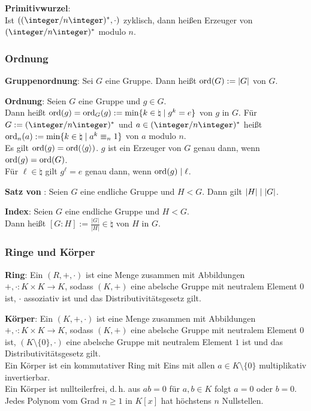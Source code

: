 \textbf{Primitivwurzel}:\\
Ist $((\ZnZ)^\ast, \cdot)$ zyklisch, dann heißen Erzeuger von $(\ZnZ)^\ast$
 modulo $n$.

\pagebreak

\subsubsection{%
    Ordnung%
}

\textbf{Gruppenordnung}:
Sei $G$ eine Gruppe.
Dann heißt $\operatorname{ord}(G) := |G|$  von $G$.

\textbf{Ordnung}:
Seien $G$ eine Gruppe und $g \in G$.\\
Dann heißt $\operatorname{ord}(g) = \operatorname{ord}_G(g) := \min\{k \in \natural \;|\; g^k = e\}$
 von $g$ in $G$.
Für $G := (\integer/n\integer)^\ast$ und $a \in (\integer/n\integer)^\ast$
heißt $\operatorname{ord}_n(a) := \min\{k \in \natural \;|\; a^k \equiv_n 1\}$
 von $a$ modulo $n$.\\
Es gilt $\operatorname{ord}(g) = \operatorname{ord}(\langle g\rangle)$.
$g$ ist ein Erzeuger von $G$ genau dann, wenn $\operatorname{ord}(g) = \operatorname{ord}(G)$.\\
Für $\ell \in \natural$ gilt $g^\ell = e$ genau dann, wenn $\operatorname{ord}(g) \mid \ell$.

\textbf{Satz von }:
Seien $G$ eine endliche Gruppe und $H < G$.
Dann gilt $|H| \mid |G|$.

\textbf{Index}:
Seien $G$ eine endliche Gruppe und $H < G$.\\
Dann heißt $[G : H] := \frac{|G|}{|H|} \in \natural$  von $H$ in $G$.

\subsubsection{%
    Ringe und Körper%
}

\textbf{Ring}:
Ein  $(R, +, \cdot)$ ist eine Menge zusammen mit Abbildungen
$+, \cdot\colon K \times K \rightarrow K$,
sodass $(K, +)$ eine abelsche Gruppe mit neutralem Element $0$ ist,
$\cdot$ assoziativ ist und
das Distributivitätsgesetz gilt.

\textbf{Körper}:
Ein  $(K, +, \cdot)$ ist eine Menge zusammen mit Abbildungen
$+, \cdot\colon K \times K \rightarrow K$,
sodass $(K, +)$ eine abelsche Gruppe mit neutralem Element $0$ ist,
$(K \setminus \{0\}, \cdot)$ eine abelsche Gruppe mit neutralem Element $1$ ist und
das Distributivitätsgesetz gilt.\\
Ein Körper ist ein kommutativer Ring mit Eins mit allen $a \in K \setminus \{0\}$
multiplikativ invertierbar.\\
Ein Körper ist nullteilerfrei, d.\,h. aus $ab = 0$ für $a, b \in K$ folgt
$a = 0$ oder $b = 0$.\\
Jedes Polynom vom Grad $n \ge 1$ in $K[x]$ hat höchstens $n$ Nullstellen.

